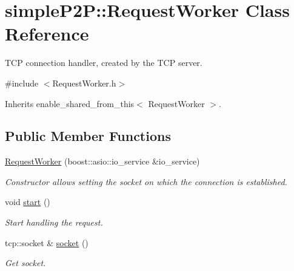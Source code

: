 \hypertarget{classsimpleP2P_1_1RequestWorker}{}\section{simple\+P2P\+:\+:Request\+Worker Class Reference}
\label{classsimpleP2P_1_1RequestWorker}


T\+CP connection handler, created by the T\+CP server.  




{\ttfamily \#include $<$Request\+Worker.\+h$>$}



Inherits enable\+\_\+shared\+\_\+from\+\_\+this$<$ Request\+Worker $>$.

\subsection*{Public Member Functions}
\begin{DoxyCompactItemize}
\item 
\mbox{\label{classsimpleP2P_1_1RequestWorker_ac5ad9c81de1edfea9e7ff01b55d46d60}} 
\hyperlink{classsimpleP2P_1_1RequestWorker_ac5ad9c81de1edfea9e7ff01b55d46d60}{Request\+Worker} (boost\+::asio\+::io\+\_\+service \&io\+\_\+service)
\begin{DoxyCompactList}\small\item\em Constructor allows setting the socket on which the connection is established. \end{DoxyCompactList}\item 
\mbox{\label{classsimpleP2P_1_1RequestWorker_a2581f6fe51f1140db9d1e7c9b33900ba}} 
void \hyperlink{classsimpleP2P_1_1RequestWorker_a2581f6fe51f1140db9d1e7c9b33900ba}{start} ()
\begin{DoxyCompactList}\small\item\em Start handling the request. \end{DoxyCompactList}\item 
\mbox{\label{classsimpleP2P_1_1RequestWorker_aaf449574acb97751ab086c519bb17955}} 
tcp\+::socket \& \hyperlink{classsimpleP2P_1_1RequestWorker_aaf449574acb97751ab086c519bb17955}{socket} ()
\begin{DoxyCompactList}\small\item\em Get socket. \end{DoxyCompactList}\end{DoxyCompactItemize}


